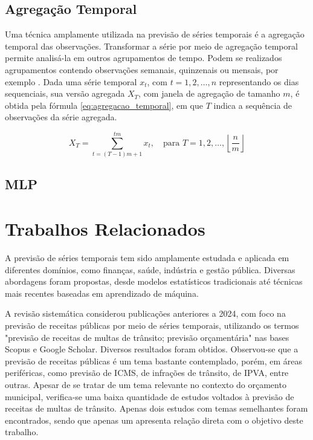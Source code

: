 \documentclass[12pt]{tcc}
\begin{document}
\section{Agregação Temporal}
\label{sec:agregacao_temporal}

Uma técnica amplamente utilizada na previsão de séries temporais é a agregação temporal das observações. Transformar a série por meio de agregação temporal permite analisá-la em outros agrupamentos de tempo. Podem se realizados agrupamentos contendo observações semanais, quinzenais ou mensais, por exemplo \citep{salles_evaluating_2016}. Dada uma série temporal $x_t$, com $t = 1, 2, \dots, n$ representando os dias sequenciais, sua versão agregada $X_T$, com janela de agregação de tamanho $m$, é obtida pela fórmula \ref{eq:agregacao_temporal}, em que $T$ indica a sequência de observações da série agregada.

\begin{equation}
X_T = \sum_{t=(T-1)m + 1}^{tm} x_t, \quad \text{para } T = 1, 2, \dots, \left\lfloor \frac{n}{m} \right\rfloor
\label{eq:agregacao_temporal}
\end{equation}

\section{MLP}
\label{sec:mlp}




\chapter{Trabalhos Relacionados}
\label{sec:trabalhos_relacionados}

A previsão de séries temporais tem sido amplamente estudada e aplicada em diferentes domínios, como finanças, saúde, indústria e gestão pública. Diversas abordagens foram propostas, desde modelos estatísticos tradicionais até técnicas mais recentes baseadas em aprendizado de máquina.

A revisão sistemática considerou publicações anteriores a 2024, com foco na previsão de receitas públicas por meio de séries temporais, utilizando os termos "previsão de receitas de multas de trânsito; previsão orçamentária" nas bases Scopus e Google Scholar. Diversos resultados foram obtidos. Observou-se que a previsão de receitas públicas é um tema bastante contemplado, porém, em áreas periféricas, como previsão de ICMS, de infrações de trânsito, de IPVA, entre outras. Apesar de se tratar de um tema relevante no contexto do orçamento municipal, verifica-se uma baixa quantidade de estudos voltados à previsão de receitas de multas de trânsito. Apenas dois estudos com temas semelhantes foram encontrados, sendo que apenas um apresenta relação direta com o objetivo deste trabalho.
\end{document}
